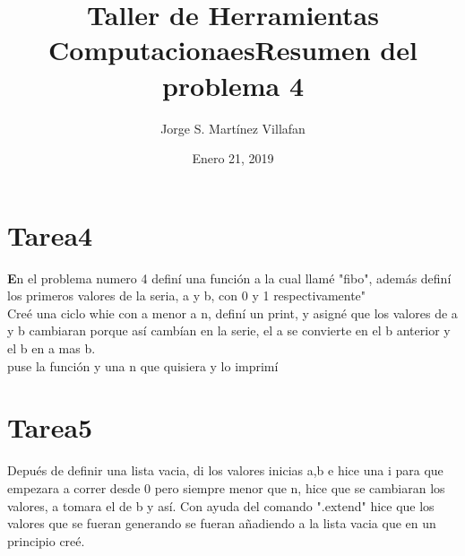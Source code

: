 \documentclass[letterpaper, 12pt, oneside]{article}%
\title{\Huge Taller de Herramientas Computacionaes}
\author{Jorge S. Martínez Villafan}
\date{Enero 21, 2019}
\begin{document}
	\maketitle
	\newpage
	\title{Resumen del problema 4}
	\section{Tarea4}
	\textbf En el problema numero 4 definí una función a la cual llamé "fibo", además definí los primeros valores de la seria, a y b, con 0 y 1 respectivamente"\\
	Creé una ciclo whie con a menor a n,  definí un print, y asigné que los valores de a y b cambiaran porque así cambían en la serie, el a se convierte en el b anterior y el b en a mas b. \\
	puse la función y una n que quisiera y lo imprimí
	
	\section{Tarea5}
	Depués de definir una lista vacia, di los valores inicias \color{red} a,b \color{black} e hice una i para que empezara a correr desde 0 pero siempre menor que n, hice que se cambiaran los valores, a tomara el de b y así. Con ayuda del comando \color{blue} ".extend" \color{black} hice que los valores que se fueran generando se fueran añadiendo a la lista vacia que en un principio creé. 
\end{document}

